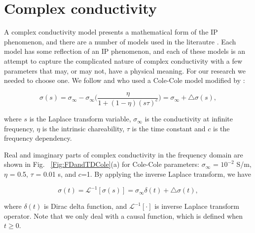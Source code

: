 \documentclass[extra,mreferee]{gji}
\newcommand{\siginf}{\sigma_\infty}
\begin{document}
\section{Complex conductivity}
A complex conductivity model presents a mathematical form of the IP phenomenon, and there are a number of models used in the literautre \cite[]{Dias2000,Tarasov2013}. Each model has some reflection of an IP phenomenon, and each of these models is an attempt to capture the complicated nature of complex conductivity with a few parameters that may, or may not, have a physical meaning. For our research we needed to choose one. We follow \cite{Smith1988a} and \cite{Marchant2014} who used a Cole-Cole model \cite[]{COLE} modified by \cite{Pelton1978}:
\begin{linenomath*}
\begin{equation}
  \sigma(s) = \sigma_{\infty} - \sigma_{\infty}\Big(\frac{\eta}{1+(1-\eta)(s \tau)^c}\Big) = \sigma_{\infty} + \triangle\sigma(s),
  \label{eq: sigma_freq}
\end{equation}
\end{linenomath*}
where $s$ is the Laplace transform variable, $\sigma_{\infty}$ is the conductivity at infinite frequency, $\eta$ is the intrinsic chareability, $\tau$ is the time constant and $c$ is the frequency dependency.


Real and imaginary parts of complex conductivity in the frequency domain are shown in Fig. ~\ref{Fig:FDandTDCole}(a) for Cole-Cole parameters: $\siginf$ = $10^{-2}$ S/m, $\eta $ = 0.5, $\tau$ = 0.01 s, and $c$=1.
By applying the inverse Laplace transform, we have
\begin{linenomath*}
\begin{equation}
  \sigma(t) = \mathscr{L}^{-1}[\sigma(s)] = \sigma_{\infty}\delta(t) + \triangle\sigma(t),
  \label{eq: sigma_time}
\end{equation}
\end{linenomath*}
where $\delta(t)$ is Dirac delta function, and $\mathscr{L}^{-1}[\cdot]$ is inverse Laplace transform operator. Note that we only deal with a causal function, which is defined when $t\ge 0$.
\end{document}
